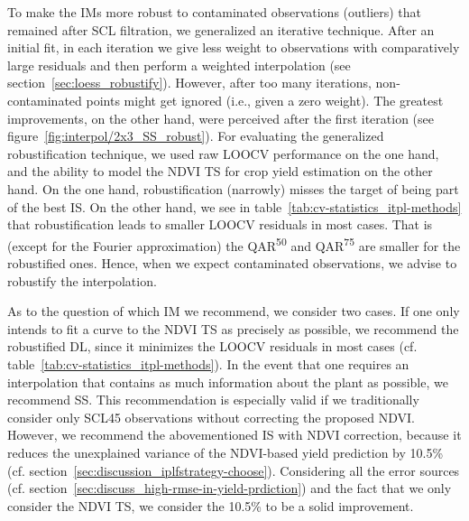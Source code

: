     To make the {{IM}}s more robust to contaminated observations (outliers) that remained after SCL filtration, we generalized an iterative technique. After an initial fit, in each iteration we give less weight to observations with comparatively large residuals and then perform a weighted interpolation (see section~\ref{sec:loess_robustify}). However, after too many iterations, non-contaminated points might get ignored (i.e., given a zero weight). The greatest improvements, on the other hand, were perceived after the first iteration (see figure~\ref{fig:interpol/2x3_SS_robust}). 
    For evaluating the generalized robustification technique, we used raw LOOCV performance on the one hand, and the ability to model the NDVI TS for crop yield estimation on the other hand.
    On the one hand, robustification (narrowly) misses the target of being part of the best {{IS}}. On the other hand, we see in table~\ref{tab:cv-statistics_itpl-methods} that robustification leads to smaller LOOCV residuals in most cases. That is (except for the Fourier approximation) the QAR\textsuperscript{50} and QAR\textsuperscript{75} are smaller for the robustified ones. Hence, when we expect contaminated observations, we advise to robustify the interpolation. 

As to the question of which {{IM}} we recommend, we consider two cases. If one only intends to fit a curve to the NDVI TS as precisely as possible, we recommend the robustified DL, since it minimizes the LOOCV residuals in most cases (cf. table~\ref{tab:cv-statistics_itpl-methods}). In the event that one requires an interpolation that contains as much information about the plant as possible, we recommend SS. This recommendation is especially valid if we traditionally consider only SCL45 observations without correcting the proposed NDVI. However, we recommend the abovementioned {{IS}} with NDVI correction, because it reduces the unexplained variance of the NDVI-based yield prediction by 10.5\% (cf. section~\ref{sec:discussion_iplfstrategy-choose}). Considering all the error sources (cf. section~\ref{sec:discuss_high-rmse-in-yield-prdiction}) and the fact that we only consider the NDVI {TS}, we consider the 10.5\% to be a solid improvement.%



